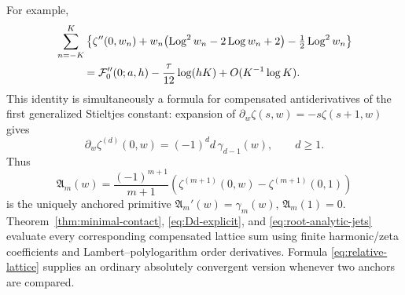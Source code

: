 For example,
\begin{equation}\label{eq:D2-cutoff}
 \begin{split}
 &\sum_{n=-K}^{K}
 \left\{\zeta''(0,w_n)+w_n\bigl(\operatorname{Log}^2w_n-2\operatorname{Log} w_n+2\bigr)
                       -\tfrac12\operatorname{Log}^2w_n\right\}\\
 &\hspace{9mm}
 ={\cal F}_0''(0;a,h)-\frac{\tau}{12}\log(hK)
            +O(K^{-1}\log K).
 \end{split}
\end{equation}
This identity is simultaneously a formula for compensated
antiderivatives of the first generalized Stieltjes constant:
expansion of
\(\partial_w\zeta(s,w)=-s\zeta(s+1,w)\) gives
\begin{equation}\label{eq:stieltjes-primitive-root}
 \partial_w\zeta^{(d)}(0,w)=(-1)^d d\,\gamma_{d-1}(w),
 \qquad d\geq1.
\end{equation}
Thus
\[
 {\mathfrak A}_m(w)=\frac{(-1)^{m+1}}{m+1}
       \left(\zeta^{(m+1)}(0,w)-\zeta^{(m+1)}(0,1)\right)
\]
is the uniquely anchored primitive
\(\mathfrak A_m'(w)=\gamma_m(w)\),
\(\mathfrak A_m(1)=0\). Theorem~\ref{thm:minimal-contact},
\eqref{eq:Dd-explicit}, and \eqref{eq:root-analytic-jets}
evaluate every corresponding compensated lattice sum using finite
harmonic/zeta coefficients and Lambert--polylogarithm order
derivatives. Formula \eqref{eq:relative-lattice} supplies an
ordinary absolutely convergent version whenever two anchors are
compared.

